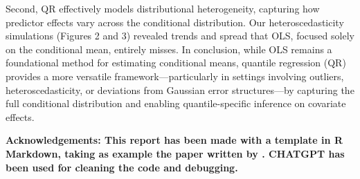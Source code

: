 \documentclass[fleqn,10pt]{latex/stylish_article} %
\begin{document}
Second, QR effectively models distributional heterogeneity, capturing how predictor effects vary across the conditional distribution. Our heteroscedasticity simulations (Figures 2 and 3) revealed trends and spread that OLS, focused solely on the conditional mean, entirely misses. In conclusion, while OLS remains a foundational method for estimating conditional means, quantile regression (QR) provides a more versatile framework---particularly in settings involving outliers, heteroscedasticity, or deviations from Gaussian error structures---by capturing the full conditional distribution and enabling quantile-specific inference on covariate effects.

\textbf{Acknowledgements: This report has been made with a template in R Markdown, taking as example the paper written by \citet{FanLi2001}. CHATGPT has been used for cleaning the code and debugging.}



\makeatletter

\makeatother


\end{document}
